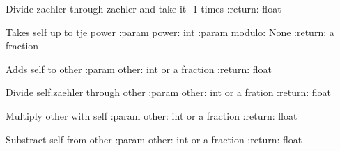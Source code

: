 \documentclass[letterpaper,10pt,english]{sphinxmanual}
\begin{document}
\begin{fulllineitems}
\begin{fulllineitems}
\end{fulllineitems}


\begin{fulllineitems}
\label{bruch:bruch.Bruch.__neg__}
Divide zaehler through zaehler and take it -1 times
:return: float

\end{fulllineitems}


\begin{fulllineitems}
\label{bruch:bruch.Bruch.__pow__}
Takes self up to tje power
:param power: int
:param modulo: None
:return: a fraction

\end{fulllineitems}


\begin{fulllineitems}
\label{bruch:bruch.Bruch.__radd__}
Adds self to other
:param other: int or a fraction
:return: float

\end{fulllineitems}


\begin{fulllineitems}
\label{bruch:bruch.Bruch.__rdiv__}
Divide self.zaehler through other
:param other: int or a fration
:return: float

\end{fulllineitems}


\begin{fulllineitems}
\label{bruch:bruch.Bruch.__rmul__}
Multiply other with self
:param other: int or a fraction
:return: float

\end{fulllineitems}


\begin{fulllineitems}
\label{bruch:bruch.Bruch.__rsub__}
Substract self from other
:param other: int or a fraction
:return: float


\end{fulllineitems}
\end{fulllineitems}
\end{document}
